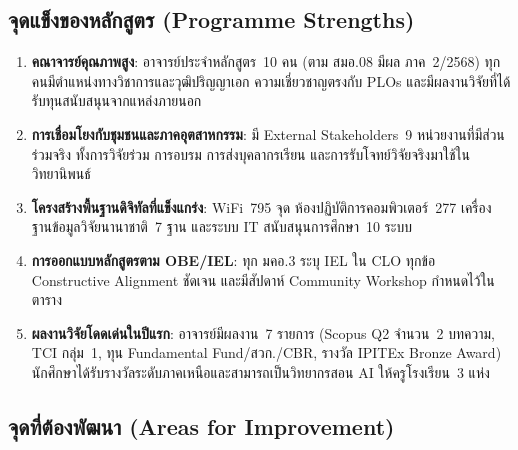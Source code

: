 \subsection*{จุดแข็งของหลักสูตร (Programme Strengths)}

\begin{enumerate}
  \item \textbf{คณาจารย์คุณภาพสูง}: อาจารย์ประจำหลักสูตร~10 คน (ตาม สมอ.08 มีผล ภาค~2/2568) ทุกคนมีตำแหน่งทางวิชาการและวุฒิปริญญาเอก ความเชี่ยวชาญตรงกับ PLOs และมีผลงานวิจัยที่ได้รับทุนสนับสนุนจากแหล่งภายนอก

  \item \textbf{การเชื่อมโยงกับชุมชนและภาคอุตสาหกรรม}: มี External Stakeholders~9 หน่วยงานที่มีส่วนร่วมจริง ทั้งการวิจัยร่วม การอบรม การส่งบุคลากรเรียน และการรับโจทย์วิจัยจริงมาใช้ในวิทยานิพนธ์

  \item \textbf{โครงสร้างพื้นฐานดิจิทัลที่แข็งแกร่ง}: WiFi~795 จุด ห้องปฏิบัติการคอมพิวเตอร์~277 เครื่อง ฐานข้อมูลวิจัยนานาชาติ~7 ฐาน และระบบ IT สนับสนุนการศึกษา~10 ระบบ

  \item \textbf{การออกแบบหลักสูตรตาม OBE/IEL}: ทุก มคอ.3 ระบุ IEL ใน CLO ทุกข้อ Constructive Alignment ชัดเจน และมีสัปดาห์ Community Workshop กำหนดไว้ในตาราง

  \item \textbf{ผลงานวิจัยโดดเด่นในปีแรก}: อาจารย์มีผลงาน~7 รายการ (Scopus Q2 จำนวน~2 บทความ, TCI กลุ่ม~1, ทุน Fundamental Fund/สวก./CBR, รางวัล IPITEx Bronze Award) นักศึกษาได้รับรางวัลระดับภาคเหนือและสามารถเป็นวิทยากรสอน AI ให้ครูโรงเรียน~3 แห่ง
\end{enumerate}

\subsection*{จุดที่ต้องพัฒนา (Areas for Improvement)}

